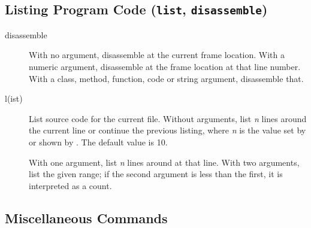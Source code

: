 \subsection{Listing Program Code ({\tt list}, {\tt disassemble})}

\begin{description}

\item[disassemble ]

With no argument, disassemble at the current frame location.  With a
numeric argument, disassemble at the frame location at that line
number. With a class, method, function, code or string argument,
disassemble that.

\item[l(ist) ]

List source code for the current file.  Without arguments, list
\emph{n} lines around the current line or continue the previous
listing, where \emph{n} is the value set by  or
shown by .  The default value is 10.

With one argument, list \emph{n} lines around at that line.  With
two arguments, list the given range; if the second argument is less
than the first, it is interpreted as a count.

\end{description}

\subsection{Miscellaneous Commands}

